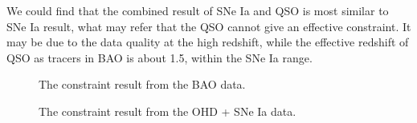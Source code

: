 \documentclass[twocolumn]{aastex631}
\begin{document}
   We could find that the combined result of SNe Ia and QSO is most
   similar to SNe Ia result, what may refer that the QSO cannot
   give an effective constraint. It may be due to the data quality
   at the high redshift, while the effective redshift of QSO as tracers in BAO
   is about 1.5, within the SNe Ia range.

   \begin{figure}[htbp]
      \centering
      \caption{The constraint result from the BAO data.}
   \end{figure}

   \begin{figure}[htbp]
      \centering
      \caption{The constraint result from the OHD + SNe Ia data.}
   \end{figure}
\end{document}
